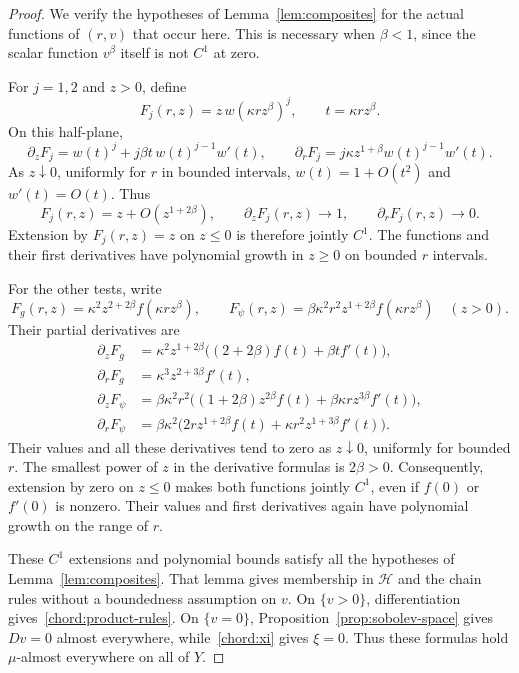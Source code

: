 \documentclass[11pt]{article}
\numberwithin{equation}{section}
\theoremstyle{definition}
\theoremstyle{remark}
\begin{document}
\begin{proof}
We verify the hypotheses of Lemma~\ref{lem:composites} for the
actual functions of $(r,v)$ that occur here. This is necessary
when $\beta<1$, since the scalar function $v^\beta$ itself is
not $C^1$ at zero.

For $j=1,2$ and $z>0$, define
\[
 F_j(r,z)=z\,w(\kappa r z^\beta)^j,
 \qquad t=\kappa r z^\beta.
\]
On this half-plane,
\[
 \partial_zF_j=w(t)^j+j\beta t\,w(t)^{j-1}w'(t),\qquad
 \partial_rF_j=j\kappa z^{1+\beta}w(t)^{j-1}w'(t).
\]
As $z\downarrow0$, uniformly for $r$ in bounded intervals,
$w(t)=1+O(t^2)$ and $w'(t)=O(t)$. Thus
\[
 F_j(r,z)=z+O(z^{1+2\beta}),\qquad
 \partial_zF_j(r,z)\longrightarrow1,
 \qquad \partial_rF_j(r,z)\longrightarrow0.
\]
Extension by $F_j(r,z)=z$ on $z\le0$ is therefore jointly $C^1$.
The functions and their first derivatives have polynomial growth
in $z\ge0$ on bounded $r$ intervals.

For the other tests, write
\[
 F_g(r,z)=\kappa^2z^{2+2\beta}f(\kappa r z^\beta),\qquad
 F_\psi(r,z)=\beta\kappa^2r^2z^{1+2\beta}
                          f(\kappa r z^\beta)
 \quad(z>0).
\]
Their partial derivatives are
\begin{align*}
 \partial_zF_g
   &=\kappa^2z^{1+2\beta}
                  \bigl((2+2\beta)f(t)+\beta t f'(t)\bigr),\\
 \partial_rF_g
   &=\kappa^3z^{2+3\beta}f'(t),\\
 \partial_zF_\psi
   &=\beta\kappa^2r^2
       \bigl((1+2\beta)z^{2\beta}f(t)
                    +\beta\kappa r z^{3\beta}f'(t)\bigr),\\
 \partial_rF_\psi
   &=\beta\kappa^2
       \bigl(2r z^{1+2\beta}f(t)
                    +\kappa r^2z^{1+3\beta}f'(t)\bigr).
\end{align*}
Their values and all these derivatives tend to zero as
$z\downarrow0$, uniformly for bounded $r$. The smallest power
of $z$ in the derivative formulas is $2\beta>0$. Consequently,
extension by zero on $z\le0$ makes both functions jointly $C^1$,
even if $f(0)$ or $f'(0)$ is nonzero. Their values and first
derivatives again have polynomial growth on the range of $r$.

These $C^1$ extensions and polynomial bounds satisfy all the
hypotheses of Lemma~\ref{lem:composites}. That lemma gives membership
in $\mathcal H$ and the chain rules without a boundedness assumption on $v$.
On $\{v>0\}$, differentiation gives~\eqref{chord:product-rules}.
On $\{v=0\}$, Proposition~\ref{prop:sobolev-space} gives $Dv=0$
almost everywhere, while~\eqref{chord:xi} gives $\xi=0$.
Thus these formulas hold $\mu$-almost everywhere on all of $Y$.
\end{proof}
\end{document}
